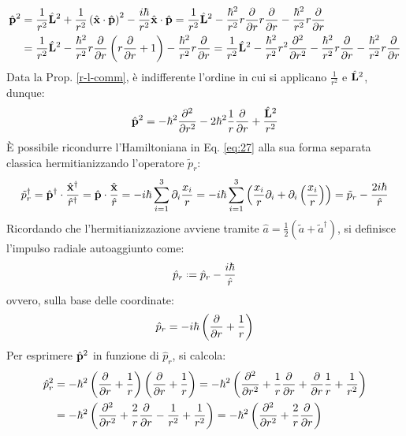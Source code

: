 \begin{equation*}
	\begin{split}
		\hat{\mathbf{p}}^2
		&= \frac{1}{r^2} \hat{\mathbf{L}}^2 + \frac{1}{r^2} \left( \hat{\mathbf{x}}\cdot\hat{\mathbf{p}} \right)^2 - \frac{i\hbar}{r^2} \hat{\mathbf{x}}\cdot\hat{\mathbf{p}} = \frac{1}{r^2} \hat{\mathbf{L}}^2 - \frac{\hbar^2}{r^2} r \frac{\partial}{\partial r} r \frac{\partial}{\partial r} - \frac{\hbar^2}{r^2} r \frac{\partial}{\partial r}\\
		&= \frac{1}{r^2} \hat{\mathbf{L}}^2 - \frac{\hbar^2}{r^2} r \frac{\partial}{\partial r} \left( r \frac{\partial}{\partial r} + 1 \right) - \frac{\hbar^2}{r^2} r \frac{\partial}{\partial r} = \frac{1}{r^2} \hat{\mathbf{L}}^2 - \frac{\hbar^2}{r^2} r^2 \frac{\partial^2}{\partial r^2} - \frac{\hbar^2}{r^2} r \frac{\partial}{\partial r} - \frac{\hbar^2}{r^2} r \frac{\partial}{\partial r}
	\end{split}
\end{equation*}
Data la Prop. \ref{r-l-comm}, è indifferente l'ordine in cui si applicano $ \frac{1}{r^2} $ e $ \hat{\mathbf{L}}^2 $, dunque:
\begin{equation}
	\hat{\mathbf{p}}^2 = -\hbar^2 \frac{\partial^2}{\partial r^2} - 2\hbar^2 \frac{1}{r} \frac{\partial}{\partial r} + \frac{\hat{\mathbf{L}}^2}{r^2}
	\label{eq:1.33}
\end{equation}
È possibile ricondurre l'Hamiltoniana in Eq. \ref{eq:27} alla sua forma separata classica hermitianizzando l'operatore $ \tilde{p}_r $:
\begin{equation*}
	\tilde{p}^{\dagger}_r = \hat{\mathbf{p}}^{\dagger} \cdot \frac{\hat{\mathbf{x}}^{\dagger}}{\hat{r}^{\dagger}} = \hat{\mathbf{p}} \cdot \frac{\hat{\mathbf{x}}}{\hat{r}} = -i\hbar \sum_{i = 1}^{3} \partial_i \frac{x_i}{r} = - i\hbar \sum_{i = 1}^{3} \left( \frac{x_i}{r} \partial_i + \partial_i \left( \frac{x_i}{r} \right) \right) = \tilde{p}_r - \frac{2i\hbar}{\hat{r}}
\end{equation*}
Ricordando che l'hermitianizzazione avviene tramite $ \hat{a} = \frac{1}{2} (\tilde{a} + \tilde{a}^{\dagger}) $, si definisce l'impulso radiale autoaggiunto come:
\begin{equation}
	\hat{p}_r \defeq \hat{p}_r - \frac{i\hbar}{\hat{r}}
	\label{eq:1.34}
\end{equation}
ovvero, sulla base delle coordinate:
\begin{equation}
	\hat{p}_r = -i\hbar \left( \frac{\partial}{\partial r} + \frac{1}{r} \right)
	\label{eq:1.35}
\end{equation}
Per esprimere $ \hat{\mathbf{p}}^2 $ in funzione di $ \hat{p}_r $, si calcola:
\begin{equation*}
	\begin{split}
		\hat{p}^2_r
		&= -\hbar^2 \left( \frac{\partial}{\partial r} + \frac{1}{r} \right) \left( \frac{\partial}{\partial r} + \frac{1}{r} \right) = -\hbar^2 \left( \frac{\partial^2}{\partial r^2} + \frac{1}{r} \frac{\partial}{\partial r} + \frac{\partial}{\partial r} \frac{1}{r} + \frac{1}{r^2} \right)\\
		&= -\hbar^2 \left( \frac{\partial^2}{\partial r^2} + \frac{2}{r} \frac{\partial}{\partial r} - \frac{1}{r^2} + \frac{1}{r^2} \right) = -\hbar^2 \left( \frac{\partial^2}{\partial r^2} + \frac{2}{r} \frac{\partial}{\partial r} \right)
	\end{split}
\end{equation*}
